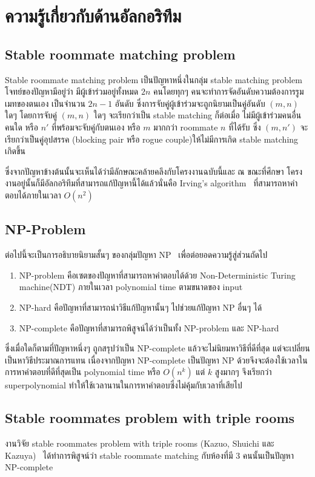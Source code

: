 
\section{ความรู้เกี่ยวกับด้านอัลกอริทึม}
\label{sec:rmp}
\subsection{Stable roommate matching problem}
Stable roommate matching problem เป็นปัญหาหนึ่งในกลุ่ม stable matching problem
โจทย์ของปัญหามีอยู่ว่า มีผู้เข้าร่วมอยู่ทั้งหมด $2n$ คนโดยทุกๆ คนจะทำการจัดอันดับความต้องการรูมเมทของตนเอง
เป็นจำนวน $2n-1$ อันดับ ซึ่งการจับคู่ผู้เข้าร่วมจะถูกนิยามเป็นคู่อันดับ $(m,n)$ ใดๆ โดยการจับคู่ $(m,n)$ ใดๆ จะเรียกว่าเป็น
stable matching ก็ต่อเมื่อ ไม่มีผู้เข้าร่วมคนอื่นคนใด หรือ $n'$ ที่พร้อมจะจับคู่กับตนเอง หรือ $m$ มากกว่า roommate $n$ ที่ได้รับ ซึ่ง $(m, n')$
จะเรียกว่าเป็นคู่อุปสรรค (blocking pair หรือ rogue couple)ให้ไม่มีการเกิด stable matching เกิดขึ้น

ซึ่งจากปัญหาข้างต้นนั้นจะเห็นได้ว่ามีลักษณะคล้ายคลึงกับโครงงานฉบับนี้และ ณ ขณะที่ศึกษา
โครงงานอยู่นั้นก็มีอัลกอริทึมที่สามารถแก้ปัญหานี้ได้แล้วนั่นคือ Irving's algorithm~\cite{irving1985efficient} ที่สามารถหาคำตอบได้ภายในเวลา $O(n^2)$

\subsection{NP-Problem}
ต่อไปนี้จะเป็นการอธิบายนิยามสั้นๆ ของกลุ่มปัญหา NP~\cite{np} เพื่อต่อยอดความรู้สู่ส่วนถัดไป
\begin{enumerate}
  \item NP-problem คือเซตของปัญหาที่สามารถหาคำตอบได้ด้วย Non-Deterministic 
    Turing machine(NDT) ภายในเวลา polynomial time ตามขนาดของ input
  \item  NP-hard คือปัญหาที่สามารถนำวิธีแก้ปัญหานั้นๆ ไปช่วยแก้ปัญหา NP อื่นๆ ได้
  \item  NP-complete คือปัญหาที่สามารถพิสูจน์ได้ว่าเป็นทั้ง NP-problem และ NP-hard
\end{enumerate}
ซึ่งเมื่อใดก็ตามที่ปัญหาหนึ่งๆ ถูกสรุปว่าเป็น NP-complete แล้วจะไม่นิยมหาวิธีที่ดีที่สุด
แต่จะเปลี่ยนเป็นหาวิธีประมาณการแทน เนื่องจากปัญหา NP-complete 
เป็นปัญหา NP ด้วยจึงจะต้องใช้เวลาในการหาคำตอบที่ดีที่สุดเป็น polynomial time หรือ $O(n^k)$
แต่ $k$ สูงมากๆ จึงเรียกว่า superpolynomial ทำให้ใช้เวลานานในการหาคำตอบซึ่งไม่คุ้มกับเวลาที่เสียไป

\subsection{Stable roommates problem with triple rooms}
งานวิจัย stable roommates problem with triple rooms (Kazuo, Shuichi และ Kazuya)~\cite{iwama2007stable}
ได้ทำการพิสูจน์ว่า stable roommate matching กับห้องที่มี 3 คนนั้นเป็นปัญหา NP-complete 


